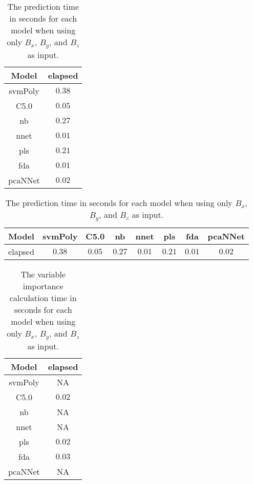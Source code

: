 \begin{table}[!ht]
	\centering
	\begin{tabular}{|c|c|}
		\hline
		Model & elapsed \\ \hline
		svmPoly & $0.38$ \\ \hline
		C5.0 & $0.05$ \\ \hline
		nb & $0.27$ \\ \hline
		nnet & $0.01$ \\ \hline
		pls & $0.21$ \\ \hline
		fda & $0.01$ \\ \hline
		pcaNNet & $0.02$ \\ \hline
	\end{tabular}
	\caption{The prediction time in seconds for each model when using only $B_{x}$, $B_{y}$, and $B_{z}$ as input.}
	\label{tab:time:coord:predict}
\end{table}

\begin{table}[!ht]
	\centering
	\begin{tabular}{|c|c|c|c|c|c|c|c|}
		\hline
		Model & svmPoly & C5.0 & nb & nnet & pls & fda & pcaNNet \\ \hline
		elapsed & $0.38$ & $0.05$ & $0.27$ & $0.01$ & $0.21$ & $0.01$ & $0.02$ \\ \hline
	\end{tabular}
	\caption{The prediction time in seconds for each model when using only $B_{x}$, $B_{y}$, and $B_{z}$ as input.}
	\label{tab:time:reverse:coord:predict}
\end{table}

\begin{table}[!ht]
	\centering
	\begin{tabular}{|c|c|}
		\hline
		Model & elapsed \\ \hline
		svmPoly & NA \\ \hline
		C5.0 & $0.02$ \\ \hline
		nb & NA \\ \hline
		nnet & NA \\ \hline
		pls & $0.02$ \\ \hline
		fda & $0.03$ \\ \hline
		pcaNNet & NA \\ \hline
	\end{tabular}
	\caption{The variable importance calculation time in seconds for each model when using only $B_{x}$, $B_{y}$, and $B_{z}$ as input.}
	\label{tab:time:coord:importance}
\end{table}

